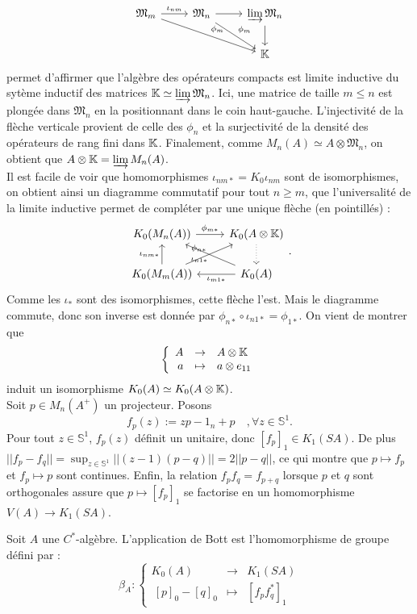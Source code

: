 \[\begin{tikzcd}
\mathfrak M_m \arrow{r}{\iota_{nm}} \arrow{drr}{\phi_m}& \mathfrak M_n \arrow{r} \arrow{dr}{\phi_m}& \varinjlim \mathfrak M_n \arrow{d} \\
				&				& \K
\end{tikzcd}\]
permet d'affirmer que l'algèbre des opérateurs compacts est limite inductive  du sytème inductif des matrices $\mathbb K \simeq \varinjlim \mathfrak M_n$. Ici, une matrice de taille $m\leq n$ est plongée dans $\mathfrak M_n$ en la positionnant dans le coin haut-gauche. L'injectivité de la flèche verticale provient de celle des $\phi_n$ et la surjectivité de la densité des opérateurs de rang fini dans $\mathbb K$. Finalement, comme $M_n(A) \simeq A\otimes \mathfrak M_n$, on obtient que $A\otimes \mathbb K = \varinjlim M_n(A)$.\\
Il est facile de voir que homomorphismes $\iota_{nm*}=K_0\iota_{nm}$ sont de isomorphismes, on obtient ainsi un diagramme commutatif pour tout $n\geq m$, que l'universalité de la limite inductive permet de compléter par une unique flèche (en pointillés) :
\[\begin{tikzcd}K_0(M_n(A)) \arrow{r}{\phi_{m*}}& K_0(A\otimes \K)\arrow[dotted]{d} \\
			K_0(M_m(A)) \arrow{u}{\iota_{nm*}}\arrow{ur}{\phi_{n*}}& K_0(A)   \arrow{l}{\iota_{m1 *}}\arrow{ul }{\iota_{n1*}}
\end{tikzcd}.\]
Comme les $\iota_*$ sont des isomorphismes, cette flèche l'est. Mais le diagramme commute, donc son inverse est donnée par $\phi_{n*}\circ\iota_{n1*}=\phi_{1*}$. On vient de montrer que 
\[\left\{\begin{array}{rcl} A & \rightarrow & A\otimes \mathbb K \\ a &\mapsto & a\otimes e_{11}\end{array}\right.\]
induit un isomorphisme $K_0(A)\simeq K_0(A\otimes \mathbb K)$.\\

Soit $p\in M_n(A^+)$ un projecteur. Posons 
\[f_p(z):= zp-1_n+p\quad, \forall z\in \mathbb S^1.\]
Pour tout $z\in \mathbb S^1$, $f_p(z)$ définit un unitaire, donc $[f_p]_1\in K_1(SA)$. De plus $||f_p-f_q||=\sup_{z\in \mathbb S^1}||(z-1)(p-q)||=2||p-q||$, ce qui montre que $p\mapsto f_p$ et $f_p\mapsto p$ sont continues. Enfin, la relation $f_p f_q=f_{p+q}$ lorsque $p$ et $q$ sont orthogonales assure que $p\mapsto [f_p]_1$ se factorise en un homomorphisme $V(A)\rightarrow K_1(SA)$. 

\begin{definition}
Soit $A$ une $C^*$-algèbre. L'application de Bott est l'homomorphisme de groupe défini par :
\[\beta_A : \left\{ \begin{array}{rcl} K_0(A) & \rightarrow & K_1(SA) \\ 
\ [p]_0-[q]_0 & \mapsto & [f_p f_q^*]_1\end{array}\right.\]
\end{definition}

